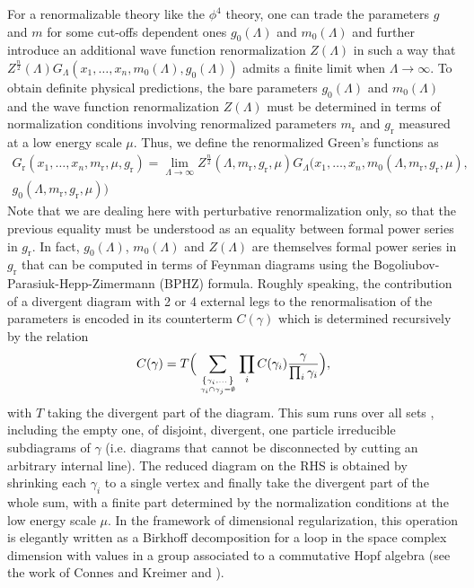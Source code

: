 \documentclass[12pt,here,feynmf]{article}
\begin{document}
For a renormalizable theory like the $\phi^{4}$ theory, one can trade the parameters $g$ and $m$ for some cut-offs dependent ones $g_{0}(\Lambda)$ and $m_{0}(\Lambda)$ and further introduce an additional wave function renormalization $Z(\Lambda)$ in such a way that $Z^{\frac{n}{2}}(\Lambda)G_{\Lambda}(x_{1},\dots,x_{n},m_{0}(\Lambda), g_{0}(\Lambda))$ admits a finite limit when $\Lambda\rightarrow\infty$. To obtain definite physical predictions, the bare parameters $g_{0}(\Lambda)$ and $m_{0}(\Lambda)$ and the wave function renormalization $Z(\Lambda)$ must be determined in terms of  normalization conditions involving renormalized parameters $m_{\mathrm{r}}$ and $g_{\mathrm{r}}$ measured at a low energy scale $\mu$. Thus, we define the renormalized Green's functions as
\begin{multline}
G_{\mathrm{r}}(x_{1},\dots,x_{n},m_{\mathrm{r}},\mu, g_{\mathrm{r}})=\lim_{\Lambda\rightarrow\infty}Z^{\frac{n}{2}}(\Lambda,m_{\mathrm{r}}, g_{\mathrm{r}},\mu)G_{\Lambda}(x_{1},\dots,x_{n},m_{0}(\Lambda,m_{\mathrm{r}}, g_{\mathrm{r}},\mu), \\
g_{0}(\Lambda,m_{\mathrm{r}}, g_{\mathrm{r}},\mu))
\end{multline}
Note that we are dealing here with perturbative renormalization only, so that the previous equality must be understood as an equality between formal power series in $g_{\mathrm{r}}$. In fact, $g_{0}(\Lambda)$, $m_{0}(\Lambda)$ and $Z(\Lambda)$ are themselves formal power series in $g_{\mathrm{r}}$ that can be computed in terms of Feynman diagrams using the Bogoliubov-Parasiuk-Hepp-Zimermann (BPHZ) formula. Roughly speaking, the contribution of a divergent diagram with 2 or 4 external legs to the renormalisation of the parameters is encoded in its counterterm $C(\gamma)$ which is determined recursively by the relation
\begin{equation} 
C(\gamma)=T\Big(\sum_{\left\{\gamma_{i},\dots\right\}\atop \gamma_{i}\cap\gamma_{j}=\emptyset}\prod_{i}C(\gamma_{i})
\frac{\gamma}{\prod_{i}\gamma_{i}}\Big),
\end{equation}
with $T$ taking the divergent part of the diagram. This sum runs over all sets , including the empty one, of disjoint, divergent, one particle irreducible subdiagrams of $\gamma$ (i.e. diagrams that cannot be disconnected by cutting an arbitrary internal line). The reduced diagram on the RHS is obtained by shrinking each $\gamma_{i}$ to a single vertex and finally take the divergent part of the whole sum, with a finite part determined by the normalization conditions at the low energy scale $\mu$. In the framework of dimensional regularization, this operation is elegantly written as a Birkhoff decomposition for a loop in the space complex dimension with values in a group associated to a commutative Hopf  algebra (see 
the work of Connes and Kreimer \cite{ck1} and \cite{ck2}).
\end{document}
